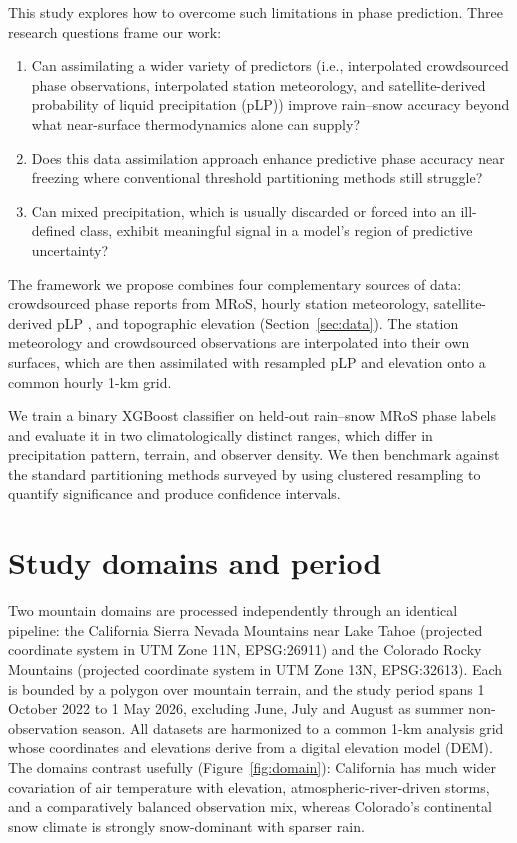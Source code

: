 \documentclass[twocol]{ametsocV6.1} %
\begin{document}
This study explores how to overcome such limitations in phase prediction. 
Three research questions frame our work:
\begin{enumerate}
  \item Can assimilating a wider variety of predictors (i.e., interpolated
  crowdsourced phase observations, interpolated station meteorology, 
  and satellite-derived probability of liquid precipitation (pLP)) 
  improve rain--snow accuracy beyond what near-surface thermodynamics alone can supply?
  \item Does this data assimilation approach enhance predictive phase accuracy 
  near freezing where conventional threshold partitioning methods still struggle?
  \item Can mixed precipitation, which is usually discarded or
  forced into an ill-defined class, exhibit meaningful signal in a model's
  region of predictive uncertainty?
\end{enumerate}

\noindent The framework we propose combines four complementary sources
of data: crowdsourced phase reports from MRoS, hourly station meteorology, 
satellite-derived pLP \citep{huffman2020imerg}, and topographic elevation
(Section~\ref{sec:data}). The station meteorology and crowdsourced
observations are interpolated into their own surfaces, which are then
assimilated with resampled pLP and elevation onto a common hourly
1-km grid.

We train a binary XGBoost classifier \citep{chen2016} on held-out rain--snow MRoS phase
labels and evaluate it in two climatologically distinct ranges, which differ
in precipitation pattern, terrain, and observer density. We then
benchmark against the standard partitioning methods surveyed by
\citet{jennings2025} using clustered resampling to quantify
significance and produce confidence intervals.

\section{Study domains and period}
\label{sec:domains}

Two mountain domains are processed independently through an identical
pipeline: the California Sierra Nevada Mountains near Lake Tahoe (projected 
coordinate system in UTM Zone 11N, EPSG:26911) and the Colorado Rocky Mountains 
(projected coordinate system in UTM Zone 13N, EPSG:32613).
Each is bounded by a polygon over mountain terrain, and the study period
spans 1 October 2022 to 1 May 2026, excluding June, July and August as 
summer non-observation season. All datasets are harmonized to a
common 1-km analysis grid whose coordinates and elevations derive from a
digital elevation model (DEM). The domains contrast usefully
(Figure~\ref{fig:domain}): California has much wider covariation of air
temperature with elevation, atmospheric-river-driven storms, and a
comparatively balanced observation mix, whereas Colorado's continental
snow climate is strongly snow-dominant with sparser rain.
\end{document}
